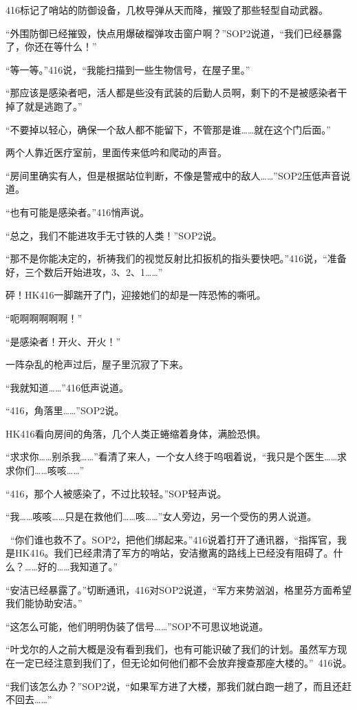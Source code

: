416标记了哨站的防御设备，几枚导弹从天而降，摧毁了那些轻型自动武器。

“外围防御已经摧毁，快点用爆破榴弹攻击窗户啊？”SOP2说道，“我们已经暴露了，你还在等什么！”

“等一等。”416说，“我能扫描到一些生物信号，在屋子里。”

“那应该是感染者吧，活人都是些没有武装的后勤人员啊，剩下的不是被感染者干掉了就是逃跑了。”

“不要掉以轻心，确保一个敌人都不能留下，不管那是谁……就在这个门后面。”

两个人靠近医疗室前，里面传来低吟和爬动的声音。

“房间里确实有人，但是根据站位判断，不像是警戒中的敌人……”SOP2压低声音说道。

“也有可能是感染者。”416悄声说。

“总之，我们不能进攻手无寸铁的人类！”SOP2说。

“那不是你能决定的，祈祷我们的视觉反射比扣扳机的指头要快吧。”416说，“准备好，三个数后开始进攻，3、2、1……”

砰！HK416一脚踹开了门，迎接她们的却是一阵恐怖的嘶吼。

“呃啊啊啊啊啊！”

“是感染者！开火、开火！”

一阵杂乱的枪声过后，屋子里沉寂了下来。 

“我就知道……”416低声说道。

“416，角落里……”SOP2说。

HK416看向房间的角落，几个人类正蜷缩着身体，满脸恐惧。

“求求你……别杀我……”看清了来人，一个女人终于呜咽着说，“我只是个医生……求求你们……咳咳……”

“416，那个人被感染了，不过比较轻。”SOP轻声说。

“我……咳咳……只是在救他们……咳……”女人旁边，另一个受伤的男人说道。

 “你们谁也救不了。SOP2，把他们绑起来。”416说着打开了通讯器，“指挥官，我是HK416。我们已经肃清了军方的哨站，安洁撤离的路线上已经没有阻碍了。什么？……好的……我知道了。”

“安洁已经暴露了。”切断通讯，416对SOP2说道，“军方来势汹汹，格里芬方面希望我们能协助安洁。”

“这怎么可能，他们明明伪装了信号……”SOP不可思议地说道。

“叶戈尔的人之前大概是没有看到我们，也有可能识破了我们的计划。虽然军方现在一定已经注意到我们了，但无论如何他们都不会放弃搜查那座大楼的。” 416说。

“我们该怎么办？”SOP2说，“如果军方进了大楼，那我们就白跑一趟了，而且还赶不回去……”

